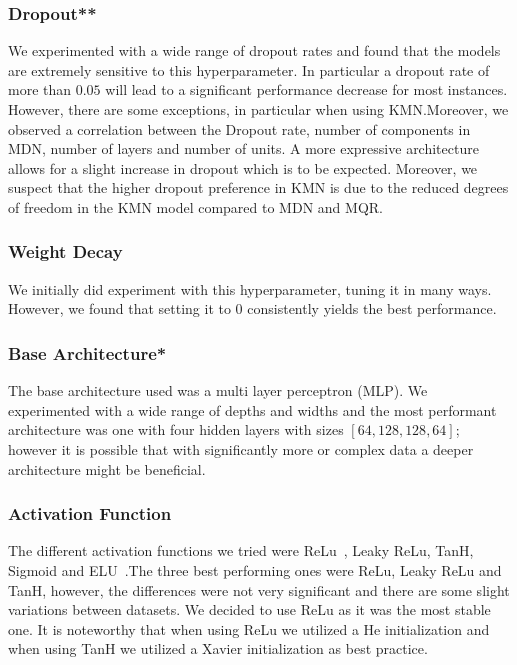 \subsubsection{Dropout**}

We experimented with a wide range of dropout rates and found that the models are extremely sensitive to this hyperparameter. In particular a dropout rate of more than $0.05$ will lead to a significant performance decrease for most instances. However, there are some exceptions, in particular when using KMN.\@ Moreover, we observed a correlation between the Dropout rate, number of components in MDN, number of layers and number of units. A more expressive architecture allows for a slight increase in dropout which is to be expected. Moreover, we suspect that the higher dropout preference in KMN is due to the reduced degrees of freedom in the KMN model compared to MDN and MQR.\@

\subsubsection{Weight Decay}

We initially did experiment with this hyperparameter, tuning it in many ways. However, we found that setting it to $0$ consistently yields the best performance.

\subsubsection{Base Architecture*}\label{sec:base_architecture}

The base architecture used was a multi layer perceptron (MLP). We experimented with a wide range of depths and widths and the most performant architecture was one with four hidden layers with sizes $[64, 128, 128, 64]$; however it is possible that with significantly more or complex data a deeper architecture might be beneficial.

\subsubsection{Activation Function}

The different activation functions we tried were ReLu~\cite{agarap2018deep}, Leaky ReLu, TanH, Sigmoid and ELU~\cite{clevert2015fast}.\@ The three best performing ones were ReLu, Leaky ReLu and TanH, however, the differences were not very significant and there are some slight variations between datasets. We decided to use ReLu as it was the most stable one. It is noteworthy that when using ReLu we utilized a He initialization and when using TanH we utilized a Xavier initialization as best practice.

